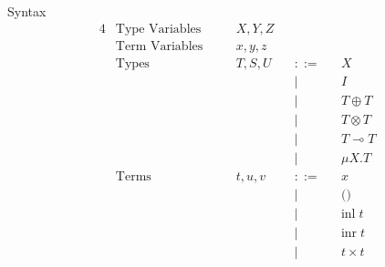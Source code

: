 \documentclass[8pt]{jsarticle}
\newcommand{\bnfdef}{::=}
\begin{document}
\begin{itembox}[c]{Syntax}
  \begin{alignat*}{4}
    &\text{Type Variables}  & \quad &X,Y,Z           &       &        &       & \\
    &\text{Term Variables}  &       &x,y,z           &       &        &       & \\
    &\text{Types}           &       &T,S,U           &       &\bnfdef &       & X \\
    &                       &       &                &       &|       &       & I \\
    &                       &       &                &       &|       &       & T \oplus T \\
    &                       &       &                &       &|       &       & T \otimes T \\
    &                       &       &                &       &|       &       & T \multimap T \\
    &                       &       &                &       &|       &       & \mu{X}.T \\
    &\text{Terms}           &       &t,u,v           &       &\bnfdef &       & x \\
    &                       &       &                &       &|       &       & \text{()} \\
    &                       &       &                &       &|       &       & \text{inl}\;t \\
    &                       &       &                &       &|       &       & \text{inr}\;t \\
    &                       &       &                &       &|       &       & t\times{}t \\

\end{alignat*}
\end{itembox}
\end{document}
